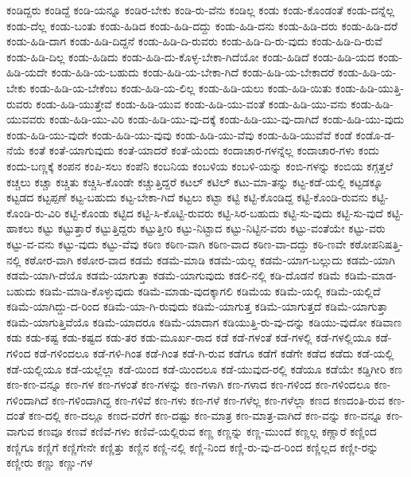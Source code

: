 {ಕಂಡಿದ್ದರು
ಕಂಡಿದ್ದೆ
ಕಂಡಿ-ಯನ್ನೂ
ಕಂಡಿರ-ಬೇಕು
ಕಂಡಿ-ರು-ವೆನು
ಕಂಡಿಲ್ಲ
ಕಂಡು
ಕಂಡು-ಕೊಂಡಂತೆ
ಕಂಡು-ದನ್ನೆಲ್ಲ
ಕಂಡು-ದೆಲ್ಲ
ಕಂಡು-ಬಂತು
ಕಂಡು-ಹಿಡಿದ
ಕಂಡು-ಹಿಡಿ-ದದ್ದು
ಕಂಡು-ಹಿಡಿ-ದನು
ಕಂಡು-ಹಿಡಿ-ದರು
ಕಂಡು-ಹಿಡಿ-ದರೆ
ಕಂಡು-ಹಿಡಿ-ದಾಗ
ಕಂಡು-ಹಿಡಿ-ದಿದ್ದನೆ
ಕಂಡು-ಹಿಡಿ-ದಿ-ರುವರು
ಕಂಡು-ಹಿಡಿ-ದಿ-ರು-ವುದು
ಕಂಡು-ಹಿಡಿ-ದಿ-ರುವೆ
ಕಂಡು-ಹಿಡಿ-ದಿಲ್ಲ
ಕಂಡು-ಹಿಡಿದು
ಕಂಡು-ಹಿಡಿ-ದು-ಕೊಳ್ಳ-ಬೇಕಾ-ಗಿದೆಯೋ
ಕಂಡು-ಹಿಡಿದೆ
ಕಂಡು-ಹಿಡಿ-ಯದ
ಕಂಡು-ಹಿಡಿ-ಯದೇ
ಕಂಡು-ಹಿಡಿ-ಯ-ಬಹುದು
ಕಂಡು-ಹಿಡಿ-ಯ-ಬೇಕಾ-ಗಿದೆ
ಕಂಡು-ಹಿಡಿ-ಯ-ಬೇಕಾದರೆ
ಕಂಡು-ಹಿಡಿ-ಯ-ಬೇಕು
ಕಂಡು-ಹಿಡಿ-ಯ-ಬೇಕೆಂಬ
ಕಂಡು-ಹಿಡಿ-ಯ-ಲಿಲ್ಲ
ಕಂಡು-ಹಿಡಿ-ಯಲು
ಕಂಡು-ಹಿಡಿ-ಯಿತು
ಕಂಡು-ಹಿಡಿ-ಯುತ್ತಿ-ರುವರು
ಕಂಡು-ಹಿಡಿ-ಯುತ್ತೇವೆ
ಕಂಡು-ಹಿಡಿ-ಯುವ
ಕಂಡು-ಹಿಡಿ-ಯು-ವಂತೆ
ಕಂಡು-ಹಿಡಿ-ಯು-ವನು
ಕಂಡು-ಹಿಡಿ-ಯುವವರು
ಕಂಡು-ಹಿಡಿ-ಯು-ವಿರಿ
ಕಂಡು-ಹಿಡಿ-ಯು-ವು-ದಕ್ಕೆ
ಕಂಡು-ಹಿಡಿ-ಯು-ವು-ದಾಗಿದೆ
ಕಂಡು-ಹಿಡಿ-ಯು-ವುದು
ಕಂಡು-ಹಿಡಿ-ಯು-ವುದೇ
ಕಂಡು-ಹಿಡಿ-ಯು-ವುವು
ಕಂಡು-ಹಿಡಿ-ಯು-ವೆವು
ಕಂಡು-ಹಿಡಿ-ಯುವೆವೆ
ಕಂಡೆ
ಕಂಡೊ-ಡ-ನೆಯೆ
ಕಂತೆ
ಕಂತೆ-ಯಾಗುವುದು
ಕಂತೆ-ಯಾದರೆ
ಕಂತೆ-ಯೆಂದು
ಕಂದಾಚಾರ-ಗಳನ್ನೆಲ್ಲ
ಕಂದಾಚಾರ-ಗಳು
ಕಂದು
ಕಂದು-ಬಣ್ಣಕ್ಕೆ
ಕಂಪನ
ಕಂಪಿ-ಸಲು
ಕಂಪೆನಿ
ಕಂಬನಿಯ
ಕಂಬಳಿಯ
ಕಂಬಳಿ-ಯನ್ನು
ಕಂಬಿ-ಗಳನ್ನು
ಕಂಬಿಯ
ಕಗ್ಗತ್ತಲೆ
ಕಚ್ಚಲು
ಕಚ್ಚಾ
ಕಚ್ಚಿತು
ಕಚ್ಚಿಸಿ-ಕೊಂಡೇ
ಕಚ್ಚುತ್ತಿದ್ದರೆ
ಕಟಲ್
ಕಟಿಲ್
ಕಟು-ಮಾ-ತನ್ನು
ಕಟ್ಟ-ಕಡೆ-ಯಲ್ಲಿ
ಕಟ್ಟಡಕ್ಕೂ
ಕಟ್ಟಡದ
ಕಟ್ಟಪ್ಪಣೆ
ಕಟ್ಟ-ಬಹುದು
ಕಟ್ಟ-ಬೇಕಾ-ಗಿದೆ
ಕಟ್ಟಲು
ಕಟ್ಟಾ
ಕಟ್ಟಿ
ಕಟ್ಟಿ-ಕೊಂಡಿದ್ದ
ಕಟ್ಟಿ-ಕೊಂಡಿ-ರುವನು
ಕಟ್ಟಿ-ಕೊಂಡಿ-ರು-ವಿರಿ
ಕಟ್ಟಿ-ಕೊಂಡು
ಕಟ್ಟಿದ
ಕಟ್ಟಿ-ಸಿ-ಕೊಟ್ಟಿ-ರುವರು
ಕಟ್ಟಿ-ಸಿರ-ಬಹುದು
ಕಟ್ಟಿ-ಸು-ವುದು
ಕಟ್ಟಿ-ಸು-ವುದೆ
ಕಟ್ಟಿ-ಹಾಕಲು
ಕಟ್ಟು
ಕಟ್ಟುತ್ತಾರೆ
ಕಟ್ಟುತ್ತಿದ್ದರು
ಕಟ್ಟುತ್ತೀರಿ
ಕಟ್ಟು-ನಿಟ್ಟಾದ
ಕಟ್ಟು-ನಿಟ್ಟಿನ-ವರು
ಕಟ್ಟು-ವಂತೆಯೇ
ಕಟ್ಟು-ವರು
ಕಟ್ಟು-ವ-ವನು
ಕಟ್ಟು-ವುದು
ಕಟ್ಟು-ವೆವು
ಕಠಿಣ
ಕಠಿಣ-ವಾಗಿ
ಕಠಿಣ-ವಾದ
ಕಠಿಣ-ವಾ-ದದ್ದು
ಕಠಿ-ಣವೇ
ಕಠೋಪನಿಷತ್ತಿ-ನಲ್ಲಿ
ಕಠೋರ-ವಾಗಿ
ಕಠೋರ-ವಾದ
ಕಡಮೆ
ಕಡಮೆ-ಮಾಡಿ
ಕಡಮೆ-ಯಲ್ಲ
ಕಡಮೆ-ಯಾಗ-ಬಲ್ಲುದು
ಕಡಮೆ-ಯಾಗಿ
ಕಡಮೆ-ಯಾಗಿ-ದೆಯೊ
ಕಡಮೆ-ಯಾಗುತ್ತಾ
ಕಡಮೆ-ಯಾಗುವುದು
ಕಡಲಿ-ನಲ್ಲಿ
ಕಡಿ-ದೊಡನೆ
ಕಡಿಮೆ
ಕಡಿಮೆ-ಮಾಡ-ಬಹುದು
ಕಡಿಮೆ-ಮಾಡಿ-ಕೊಳ್ಳುವುದು
ಕಡಿಮೆ-ಮಾಡು-ವುದಕ್ಕಾಗಲಿ
ಕಡಿಮೆಯ
ಕಡಿಮೆ-ಯಲ್ಲಿ
ಕಡಿಮೆ-ಯಲ್ಲಿದೆ
ಕಡಿಮೆ-ಯಾಗಿದ್ದು-ದ-ರಿಂದ
ಕಡಿಮೆ-ಯಾ-ಗಿ-ರುವುದು
ಕಡಿಮೆ-ಯಾಗುತ್ತ
ಕಡಿಮೆ-ಯಾಗುತ್ತದೆ
ಕಡಿಮೆ-ಯಾಗುತ್ತಾ
ಕಡಿಮೆ-ಯಾಗುತ್ತಿವೆಯೊ
ಕಡಿಮೆ-ಯಾದರೂ
ಕಡಿಮೆ-ಯಾದಾಗ
ಕಡಿಯುತ್ತಿ-ರು-ವು-ದನ್ನು
ಕಡಿಯು-ವುದೋ
ಕಡಿವಾಣ
ಕಡು
ಕಡು-ಕಷ್ಟ
ಕಡು-ಕಷ್ಟದ
ಕಡು-ತರ
ಕಡು-ಮೂರ್ಖ-ರಾದ
ಕಡೆ
ಕಡೆ-ಗಳಂತೆ
ಕಡೆ-ಗಳಲ್ಲಿ
ಕಡೆ-ಗಳಲ್ಲಿಯೂ
ಕಡೆ-ಗಳಿಂದ
ಕಡೆ-ಗಳಿಂದಲೂ
ಕಡೆ-ಗಳಿ-ಗಿಂತ
ಕಡೆ-ಗಿಂತ
ಕಡೆ-ಗಿ-ರುವ
ಕಡೆಗೂ
ಕಡೆಗೆ
ಕಡೆಗೇ
ಕಡೆದ
ಕಡೆದು
ಕಡೆ-ಯಲ್ಲಿ
ಕಡೆ-ಯಲ್ಲಿಯೂ
ಕಡೆ-ಯಲ್ಲೆಲ್ಲಾ
ಕಡೆ-ಯಿಂದ
ಕಡೆ-ಯಿಂದಲೂ
ಕಡೆ-ಯುವುದ-ರಲ್ಲಿ
ಕಡೆಯೂ
ಕಡೆಯೇ
ಕಡ್ಡಿಗೀರಿ
ಕಣ
ಕಣ-ಕಣ-ವನ್ನೂ
ಕಣ-ಗಳ
ಕಣ-ಗಳಂತೆ
ಕಣ-ಗಳನ್ನು
ಕಣ-ಗಳಾಗಿ
ಕಣ-ಗಳಾದ
ಕಣ-ಗಳಿಂದ
ಕಣ-ಗಳಿಂದಲೂ
ಕಣ-ಗಳಿಂದಾಗಿದೆ
ಕಣ-ಗಳಿಂದಾಗಿದ್ದ
ಕಣ-ಗಳಿವೆ
ಕಣ-ಗಳು
ಕಣ-ಗಳೆ
ಕಣ-ಗಳೆಲ್ಲ
ಕಣ-ಗಳೆಲ್ಲಾ
ಕಣದ
ಕಣದಂತಿ-ರುವ
ಕಣ-ದಂತೆ
ಕಣ-ದಲ್ಲಿ
ಕಣ-ದಲ್ಲೂ
ಕಣದ-ವರೆಗೆ
ಕಣ-ದಷ್ಟು
ಕಣ-ಮಾತ್ರ
ಕಣ-ಮಾತ್ರ-ವಾಗಿದೆ
ಕಣ-ವನ್ನು
ಕಣ-ವನ್ನೂ
ಕಣ-ವಾಗುವ
ಕಣವೂ
ಕಣವೆ
ಕಣಿವೆ-ಗಳು
ಕಣಿವೆ-ಯಲ್ಲಿರುವ
ಕಣ್ಣ
ಕಣ್ಣನ್ನು
ಕಣ್ಣ-ಮುಂದೆ
ಕಣ್ಣಲ್ಲ
ಕಣ್ಣಾರೆ
ಕಣ್ಣಿಂದ
ಕಣ್ಣಿಗೂ
ಕಣ್ಣಿಗೆ
ಕಣ್ಣಿಗೇನೇ
ಕಣ್ಣಿತ್ತು
ಕಣ್ಣಿನ
ಕಣ್ಣಿ-ನಲ್ಲಿ
ಕಣ್ಣಿ-ನಿಂದ
ಕಣ್ಣಿ-ರು-ವು-ದ-ರಿಂದ
ಕಣ್ಣಿಲ್ಲದ
ಕಣ್ಣೀ-ರನ್ನು
ಕಣ್ಣೀರು
ಕಣ್ಣು
ಕಣ್ಣು-ಗಳ
}
